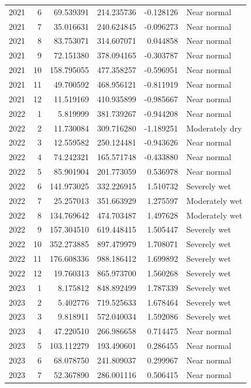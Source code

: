 \begin{tabular}{rrrrrl}
2021 & 6 & 69.539391 & 214.235736 & -0.128126 & Near normal \\
2021 & 7 & 35.016631 & 240.624845 & -0.096273 & Near normal \\
2021 & 8 & 83.753071 & 314.607071 & 0.044858 & Near normal \\
2021 & 9 & 72.151380 & 378.094165 & -0.303787 & Near normal \\
2021 & 10 & 158.795055 & 477.358257 & -0.596951 & Near normal \\
2021 & 11 & 49.700592 & 468.956121 & -0.811919 & Near normal \\
2021 & 12 & 11.519169 & 410.935899 & -0.985667 & Near normal \\
2022 & 1 & 5.819999 & 381.739267 & -0.944208 & Near normal \\
2022 & 2 & 11.730084 & 309.716280 & -1.189251 & Moderately dry \\
2022 & 3 & 12.559582 & 250.124481 & -0.943626 & Near normal \\
2022 & 4 & 74.242321 & 165.571748 & -0.433880 & Near normal \\
2022 & 5 & 85.901904 & 201.773059 & 0.536978 & Near normal \\
2022 & 6 & 141.973025 & 332.226915 & 1.510732 & Severely wet \\
2022 & 7 & 25.257013 & 351.663929 & 1.275597 & Moderately wet \\
2022 & 8 & 134.769642 & 474.703487 & 1.497628 & Moderately wet \\
2022 & 9 & 157.304510 & 619.448415 & 1.505447 & Severely wet \\
2022 & 10 & 352.273885 & 897.479979 & 1.708071 & Severely wet \\
2022 & 11 & 176.608336 & 988.186412 & 1.699892 & Severely wet \\
2022 & 12 & 19.760313 & 865.973700 & 1.560268 & Severely wet \\
2023 & 1 & 8.175812 & 848.892499 & 1.787339 & Severely wet \\
2023 & 2 & 5.402776 & 719.525633 & 1.678464 & Severely wet \\
2023 & 3 & 9.818911 & 572.040034 & 1.592086 & Severely wet \\
2023 & 4 & 47.220510 & 266.986658 & 0.714475 & Near normal \\
2023 & 5 & 103.112279 & 193.490601 & 0.286455 & Near normal \\
2023 & 6 & 68.078750 & 241.809037 & 0.299967 & Near normal \\
2023 & 7 & 52.367890 & 286.001116 & 0.506415 & Near normal \\

\end{tabular}
